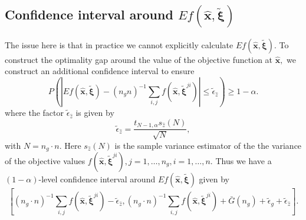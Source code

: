 \documentclass[11pt]{article}
\begin{document}
\subsection{Confidence interval around $Ef(\mathbf{\hat{x}}, \mathbf{\tilde{\xi}})$}
The issue here is that in practice we cannot explicitly calculate $Ef(\mathbf{\hat{x}}, \mathbf{\tilde{\xi}}).$ To construct the optimality gap around the value of the objective function at $\mathbf{\hat{x}},$ we construct an additional confidence interval to ensure 
$$
P\left(\left|Ef(\mathbf{\hat{x}}, \mathbf{\tilde{\xi}}) - (n_g n)^{-1} \sum_{i, j} f(\mathbf{\hat{x}}, \mathbf{\tilde{\xi}}^{ji})\right| \le \tilde{\epsilon}_{\hat{z}}\right) \ge 1 - \alpha.
$$
where the factor $\tilde{\epsilon}_{\hat{z}}$ is given by
$$
	\tilde{\epsilon}_{\hat{z}} = \frac{t_{N-1, \alpha} s_{\hat{z}}(N)}{\sqrt{N}},
$$
with $N = n_g \cdot n.$ Here $s_{\hat{z}}(N)$ is the sample variance estimator of the the variance of the objective values $f(\mathbf{\hat{x}}, \mathbf{\tilde{\xi}}^{ji}), j = 1, \dots, n_g, i = 1, \dots, n.$ Thus we have a $(1-\alpha)$-level confidence interval around $Ef(\mathbf{\hat{x}}, \mathbf{\tilde{\xi}})$ given by
$$
\left[(n_g \cdot n)^{-1} \sum_{i, j} f(\mathbf{\hat{x}}, \mathbf{\tilde{\xi}}^{ji}) - \tilde{\epsilon}_{\hat{z}}, (n_g \cdot n)^{-1} \sum_{i, j} f(\mathbf{\hat{x}}, \mathbf{\tilde{\xi}}^{ji}) + \bar{G}(n_g) + \tilde{\epsilon}_g + \tilde{\epsilon}_{\hat{z}}\right].
$$
\end{document}
